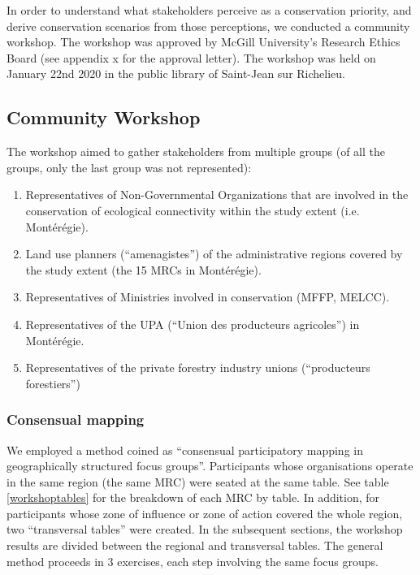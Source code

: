 In order to understand what stakeholders perceive as a conservation priority, and derive conservation scenarios from those perceptions, we conducted a community workshop. The workshop was approved by McGill University’s Research Ethics Board (see appendix {x} for the approval letter). The workshop was held on January 22nd 2020 in the public library of Saint-Jean sur Richelieu. \\

\subsection{Community Workshop}

The workshop aimed to gather stakeholders from multiple groups (of all the groups, only the last group was not represented):
\begin{enumerate}
  \item Representatives of Non-Governmental Organizations that are involved in the conservation of ecological connectivity within the study extent (i.e. Montérégie).
  \item Land use planners (“amenagistes”) of the administrative regions covered by the study extent (the 15 MRCs in Montérégie).
  \item Representatives of Ministries involved in conservation (MFFP, MELCC).
  \item Representatives of the UPA (“Union des producteurs agricoles”) in Montérégie.
  \item Representatives of the private forestry industry unions (“producteurs forestiers”) \\
\end{enumerate}

\subsubsection{Consensual mapping}

We employed a method coined as “consensual participatory mapping in geographically structured focus groups”. Participants whose organisations operate in the same region (the same MRC) were seated at the same table. See table \ref{workshoptables} for the breakdown of each MRC by table. In addition, for participants whose zone of influence or zone of action covered the whole region, two “transversal tables” were created. In the subsequent sections, the workshop results are divided between the regional and transversal tables.
The general method proceeds in 3 exercises, each step involving the same focus groups.

